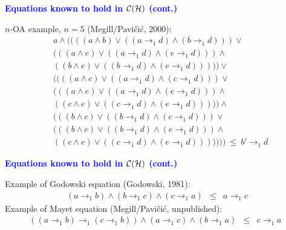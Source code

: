 \documentclass{slides}
\begin{document}
\begin{slide}

\begin{center}
\textcolor{blue}{\textbf{Equations known to hold in ${\cal C}({\cal H})$ (cont.)}} \\
\end{center}

$n$-OA example, $n=5$ (Megill/Pavi\v ci\'c, 2000):
\begin{eqnarray}
& a\wedge (
  ((  (a\wedge b) \vee ((a\to_1 d)\wedge (b\to_1 d)) )\vee        \nonumber\\
& ((  (a\wedge e) \vee ((a\to_1 d)\wedge (e\to_1 d)) ) \wedge     \nonumber\\
& (   (b\wedge e) \vee ((b\to_1 d)\wedge (e\to_1 d)) ))) \vee     \nonumber\\
& ((( (a\wedge c) \vee ((a\to_1 d)\wedge (c\to_1 d)) )\vee        \nonumber\\
& ((  (a\wedge e) \vee ((a\to_1 d)\wedge (e\to_1 d)) ) \wedge     \nonumber\\
& (   (c\wedge e) \vee ((c\to_1 d)\wedge (e\to_1 d)) )))  \wedge  \nonumber\\
& ((  (b\wedge c) \vee ((b\to_1 d)\wedge (c\to_1 d)) ) \vee       \nonumber\\
& ((  (b\wedge e) \vee ((b\to_1 d)\wedge (e\to_1 d)) ) \wedge     \nonumber\\
& (   (c\wedge e) \vee ((c\to_1 d)\wedge (e\to_1 d)) )))
  ))\ \le\ b'\to_1 d
\end{eqnarray}

\end{slide}
\begin{slide}

\begin{center}
\textcolor{blue}{\textbf{Equations known to hold in ${\cal C}({\cal H})$ (cont.)}} \\
\end{center}

Example of Godowski equation (Godowski, 1981):
\begin{eqnarray}
(a\to_1 b)\wedge (b\to_1 c)\wedge (c\to_1 a)
&\le& a\to_1 c
\end{eqnarray}
Example of Mayet equation (Megill/Pavi\v ci\'c, unpublished):
\begin{eqnarray}
( ( a \to_1 b ) \to_1 ( c \to_1 b ) ) \wedge
                     ( a \to_1 c ) \wedge ( b \to_1 a )& \le&  c \to_1 a \ \
\end{eqnarray}

\end{slide}
\end{document}
